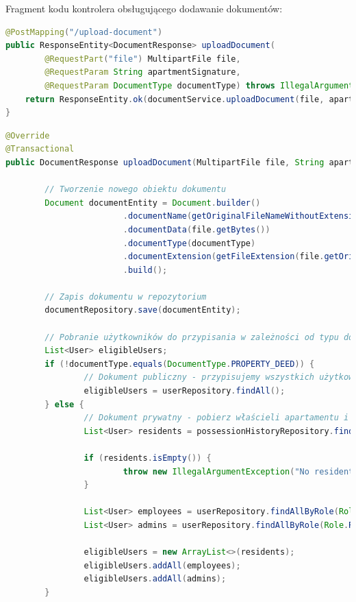 Fragment kodu kontrolera obsługującego dodawanie dokumentów:
\begin{lstlisting}[language=Java, style=JavaStyle, caption=Fragment klasy \texttt{DocumentController}]
@PostMapping("/upload-document")
public ResponseEntity<DocumentResponse> uploadDocument(
        @RequestPart("file") MultipartFile file,
        @RequestParam String apartmentSignature,
        @RequestParam DocumentType documentType) throws IllegalArgumentException, IOException {
    return ResponseEntity.ok(documentService.uploadDocument(file, apartmentSignature, documentType));
}
\end{lstlisting}

\begin{lstlisting}[language=Java, style=JavaStyle, caption=Metoda dodawania dokumentu w klasie \texttt{DocumentServiceImp}]
@Override
@Transactional
public DocumentResponse uploadDocument(MultipartFile file, String apartmentSignature, DocumentType documentType) throws IllegalArgumentException, IOException {

		// Tworzenie nowego obiektu dokumentu
		Document documentEntity = Document.builder()
						.documentName(getOriginalFileNameWithoutExtension(file.getOriginalFilename()))
						.documentData(file.getBytes())
						.documentType(documentType)
						.documentExtension(getFileExtension(file.getOriginalFilename()))
						.build();

		// Zapis dokumentu w repozytorium
		documentRepository.save(documentEntity);

		// Pobranie użytkowników do przypisania w zależności od typu dokumentu
		List<User> eligibleUsers;
		if (!documentType.equals(DocumentType.PROPERTY_DEED)) {
				// Dokument publiczny - przypisujemy wszystkich użytkowników
				eligibleUsers = userRepository.findAll();
		} else {
				// Dokument prywatny - pobierz właścieli apartamentu i pracowników oraz adminów
				List<User> residents = possessionHistoryRepository.findActiveResidentsByApartment(apartmentSignature);

				if (residents.isEmpty()) {
						throw new IllegalArgumentException("No residents found in apartment with signature: " + apartmentSignature);
				}

				List<User> employees = userRepository.findAllByRole(Role.ROLE_EMPLOYEE);
				List<User> admins = userRepository.findAllByRole(Role.ROLE_ADMIN);

				eligibleUsers = new ArrayList<>(residents);
				eligibleUsers.addAll(employees);
				eligibleUsers.addAll(admins);
		}


\end{lstlisting}
